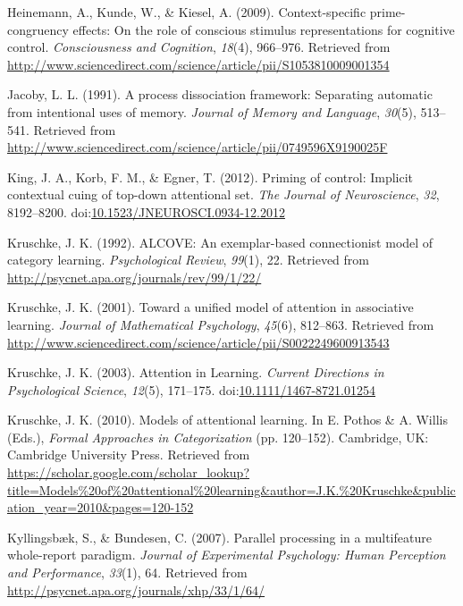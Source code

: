 \documentclass[english,,man,floatsintext]{apa6}
\begin{document}
\hypertarget{ref-heinemann_context-specific_2009}{}
Heinemann, A., Kunde, W., \& Kiesel, A. (2009). Context-specific
prime-congruency effects: On the role of conscious stimulus
representations for cognitive control. \emph{Consciousness and
Cognition}, \emph{18}(4), 966--976. Retrieved from
\url{http://www.sciencedirect.com/science/article/pii/S1053810009001354}

\hypertarget{ref-jacoby_process_1991}{}
Jacoby, L. L. (1991). A process dissociation framework: Separating
automatic from intentional uses of memory. \emph{Journal of Memory and
Language}, \emph{30}(5), 513--541. Retrieved from
\url{http://www.sciencedirect.com/science/article/pii/0749596X9190025F}

\hypertarget{ref-king_priming_2012}{}
King, J. A., Korb, F. M., \& Egner, T. (2012). Priming of control:
Implicit contextual cuing of top-down attentional set. \emph{The Journal
of Neuroscience}, \emph{32}, 8192--8200.
doi:\href{https://doi.org/10.1523/JNEUROSCI.0934-12.2012}{10.1523/JNEUROSCI.0934-12.2012}

\hypertarget{ref-kruschke_alcove:_1992}{}
Kruschke, J. K. (1992). ALCOVE: An exemplar-based connectionist model of
category learning. \emph{Psychological Review}, \emph{99}(1), 22.
Retrieved from \url{http://psycnet.apa.org/journals/rev/99/1/22/}

\hypertarget{ref-kruschke_toward_2001}{}
Kruschke, J. K. (2001). Toward a unified model of attention in
associative learning. \emph{Journal of Mathematical Psychology},
\emph{45}(6), 812--863. Retrieved from
\url{http://www.sciencedirect.com/science/article/pii/S0022249600913543}

\hypertarget{ref-kruschke_attention_2003}{}
Kruschke, J. K. (2003). Attention in Learning. \emph{Current Directions
in Psychological Science}, \emph{12}(5), 171--175.
doi:\href{https://doi.org/10.1111/1467-8721.01254}{10.1111/1467-8721.01254}

\hypertarget{ref-kruschke_models_2010}{}
Kruschke, J. K. (2010). Models of attentional learning. In E. Pothos \&
A. Willis (Eds.), \emph{Formal Approaches in Categorization} (pp.
120--152). Cambridge, UK: Cambridge University Press. Retrieved from
\url{https://scholar.google.com/scholar_lookup?title=Models\%20of\%20attentional\%20learning\&author=J.K.\%20Kruschke\&publication_year=2010\&pages=120-152}

\hypertarget{ref-kyllingsbaek_parallel_2007}{}
Kyllingsbæk, S., \& Bundesen, C. (2007). Parallel processing in a
multifeature whole-report paradigm. \emph{Journal of Experimental
Psychology: Human Perception and Performance}, \emph{33}(1), 64.
Retrieved from \url{http://psycnet.apa.org/journals/xhp/33/1/64/}
\end{document}
